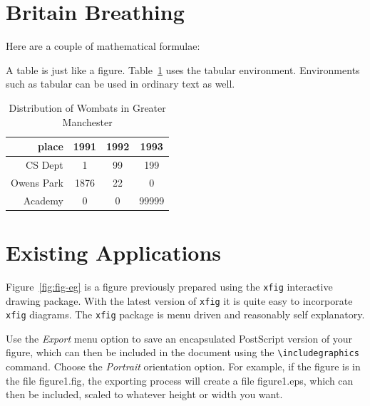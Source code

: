 \section{Britain Breathing}

Here are a couple of mathematical formulae:


A table is just like a figure. Table~\ref{wombat} uses the tabular
environment.  Environments such as tabular can be used in ordinary
text as well.
\begin{table}
\begin{center}
\begin{tabular}{|r|c|c|c|}\hline\hline
place&1991&1992&1993\\\hline
CS Dept& 1&99&199\\
Owens Park& 1876& 22&0\\
Academy&0&0&99999\\\hline\hline
\end{tabular}
\end{center}
\caption{Distribution of Wombats in Greater Manchester}\label{wombat}
\end{table}


\section{Existing Applications}
\label{sec:diagrams}

Figure~\ref{fig:fig-eg} is a figure previously prepared using the
\texttt{xfig} interactive drawing package. With the latest version of
\texttt{xfig} it is quite easy to incorporate \texttt{xfig} diagrams.
The \texttt{xfig} package is menu driven and reasonably self
explanatory.

Use the \emph{Export} menu option to save an encapsulated PostScript
version of your figure, which can then be included in the document
using the \verb=\includegraphics= command. Choose the \emph{Portrait}
orientation option. For example, if the figure is in the file \textsf{
  figure1.fig}, the exporting process will create a file \textsf{
  figure1.eps}, which can then be included, scaled to whatever height
or width you want.


